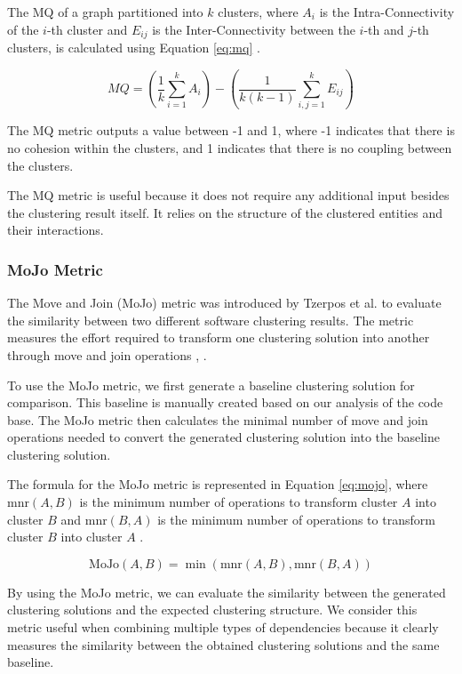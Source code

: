 \documentclass{ieeeaccess}
\begin{document}
The MQ of a graph partitioned into \( k \) clusters, where \( A_i \) is the Intra-Connectivity of the \( i \)-th cluster and \( E_{ij} \) is the Inter-Connectivity between the \( i \)-th and \( j \)-th clusters, is calculated using Equation \eqref{eq:mq} \cite{b2}.

\begin{equation}
MQ = \left( \frac{1}{k} \sum_{i=1}^{k} A_i \right) - \left( \frac{1}{k(k-1)} \sum_{i,j=1}^{k} E_{ij} \right)
\label{eq:mq}
\end{equation}

The MQ metric outputs a value between -1 and 1, where -1 indicates that there is no cohesion within the clusters, and 1 indicates that there is no coupling between the clusters.

The MQ metric is useful because it does not require any additional input besides the clustering result itself. It relies on the structure of the clustered entities and their interactions. 

\subsubsection{MoJo Metric}

The Move and Join (MoJo) metric was introduced by Tzerpos et al. to evaluate the similarity between two different software clustering results. The metric measures the effort required to transform one clustering solution into another through move and join operations \cite{b3}, \cite{b11}.

To use the MoJo metric, we first generate a baseline clustering solution for comparison. This baseline is manually created based on our analysis of the code base. The MoJo metric then calculates the minimal number of move and join operations needed to convert the generated clustering solution into the baseline clustering solution.

The formula for the MoJo metric is represented in Equation \eqref{eq:mojo}, where \( \text{mnr}(A, B) \) is the minimum number of operations to transform cluster \( A \) into cluster \( B \) and \( \text{mnr}(B, A) \) is the minimum number of operations to transform cluster \( B \) into cluster \( A \) \cite{b3}. 


\begin{equation}
\text{MoJo}(A, B) = \min(\text{mnr}(A, B), \text{mnr}(B, A))
\label{eq:mojo}
\end{equation}

By using the MoJo metric, we can evaluate the similarity between the generated clustering solutions and the expected clustering structure. We consider this metric useful when combining multiple types of dependencies because it clearly measures the similarity between the obtained clustering solutions and the same baseline.
\end{document}
